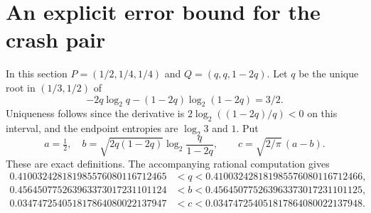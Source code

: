 \documentclass[11pt,a4paper]{article}
\begin{document}
\section{An explicit error bound for the crash pair}\label{sec:finite}
In this section $P=(1/2,1/4,1/4)$ and $Q=(q,q,1-2q)$.
Let $q$ be the unique root in $(1/3,1/2)$ of
\[
-2q\log_2q-(1-2q)\log_2(1-2q)=3/2.
\]
Uniqueness follows since the derivative is
$2\log_2((1-2q)/q)<0$ on this interval, and the endpoint entropies
are $\log_2 3$ and $1$. Put
\[
a=\tfrac12,\quad b=\sqrt{2q(1-2q)}\log_2\frac q{1-2q},
\qquad c=\sqrt{2/\pi}\,(a-b).
\]
These are exact definitions. The accompanying rational computation gives
\begin{align*}
0.410032428181985576080116712465
&<q<0.410032428181985576080116712466,\\
0.456450775263963373017231101124
&<b<0.456450775263963373017231101125,\\
0.034747254051817864080022137947
&<c<0.034747254051817864080022137948.
\end{align*}
\end{document}

